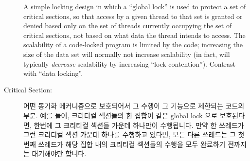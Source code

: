 \begin{description}
	A simple locking design in which a ``global lock'' is used to protect
	a set of critical sections, so that access by a given thread
	to that set is
	granted or denied based only on the set of threads currently
	occupying the set of critical sections, not based on what
	data the thread intends to access.
	The scalability of a code-locked program is limited by the code;
	increasing the size of the data set will normally not increase
	scalability (in fact, will typically \emph{decrease} scalability
	by increasing ``lock contention'').
	Contrast with ``data locking''.
	\fi
\item[Critical Section:]
	어떤 동기화 메커니즘으로 보호되어서 그 수행이 그 기능으로 제한되는
	코드의 부분.
	예를 들어, 크리티컬 섹션들의 한 집합이 같은 global lock 으로
	보호된다면, 한번에 그 크리티컬 섹션들 가운데 하나만이 수행됩니다.
	만약 한 쓰레드가 그런 크리티컬 섹션 가운데 하나를 수행하고 있다면, 모든
	다른 쓰레드는 그 첫번째 쓰레드가 해당 집합 내의 크리티컬 섹션들의
	수행을 모두 완료하기 전까지는 대기해야만 합니다.
	\iffalse


\end{description}
